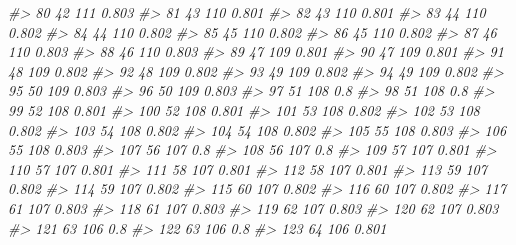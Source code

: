 \documentclass[
]{book}
\newenvironment{Shaded}{\begin{snugshade}}{\end{snugshade}}
\newcommand{\CommentTok}[1]{\textcolor[rgb]{0.56,0.35,0.01}{\textit{#1}}}
\begin{document}
\begin{Shaded}
\begin{Highlighting}[]
\CommentTok{\#\textgreater{} 80          42      111 0.803}
\CommentTok{\#\textgreater{} 81          43      110 0.801}
\CommentTok{\#\textgreater{} 82          43      110 0.801}
\CommentTok{\#\textgreater{} 83          44      110 0.802}
\CommentTok{\#\textgreater{} 84          44      110 0.802}
\CommentTok{\#\textgreater{} 85          45      110 0.802}
\CommentTok{\#\textgreater{} 86          45      110 0.802}
\CommentTok{\#\textgreater{} 87          46      110 0.803}
\CommentTok{\#\textgreater{} 88          46      110 0.803}
\CommentTok{\#\textgreater{} 89          47      109 0.801}
\CommentTok{\#\textgreater{} 90          47      109 0.801}
\CommentTok{\#\textgreater{} 91          48      109 0.802}
\CommentTok{\#\textgreater{} 92          48      109 0.802}
\CommentTok{\#\textgreater{} 93          49      109 0.802}
\CommentTok{\#\textgreater{} 94          49      109 0.802}
\CommentTok{\#\textgreater{} 95          50      109 0.803}
\CommentTok{\#\textgreater{} 96          50      109 0.803}
\CommentTok{\#\textgreater{} 97          51      108   0.8}
\CommentTok{\#\textgreater{} 98          51      108   0.8}
\CommentTok{\#\textgreater{} 99          52      108 0.801}
\CommentTok{\#\textgreater{} 100         52      108 0.801}
\CommentTok{\#\textgreater{} 101         53      108 0.802}
\CommentTok{\#\textgreater{} 102         53      108 0.802}
\CommentTok{\#\textgreater{} 103         54      108 0.802}
\CommentTok{\#\textgreater{} 104         54      108 0.802}
\CommentTok{\#\textgreater{} 105         55      108 0.803}
\CommentTok{\#\textgreater{} 106         55      108 0.803}
\CommentTok{\#\textgreater{} 107         56      107   0.8}
\CommentTok{\#\textgreater{} 108         56      107   0.8}
\CommentTok{\#\textgreater{} 109         57      107 0.801}
\CommentTok{\#\textgreater{} 110         57      107 0.801}
\CommentTok{\#\textgreater{} 111         58      107 0.801}
\CommentTok{\#\textgreater{} 112         58      107 0.801}
\CommentTok{\#\textgreater{} 113         59      107 0.802}
\CommentTok{\#\textgreater{} 114         59      107 0.802}
\CommentTok{\#\textgreater{} 115         60      107 0.802}
\CommentTok{\#\textgreater{} 116         60      107 0.802}
\CommentTok{\#\textgreater{} 117         61      107 0.803}
\CommentTok{\#\textgreater{} 118         61      107 0.803}
\CommentTok{\#\textgreater{} 119         62      107 0.803}
\CommentTok{\#\textgreater{} 120         62      107 0.803}
\CommentTok{\#\textgreater{} 121         63      106   0.8}
\CommentTok{\#\textgreater{} 122         63      106   0.8}
\CommentTok{\#\textgreater{} 123         64      106 0.801}

\end{Highlighting}
\end{Shaded}
\end{document}

